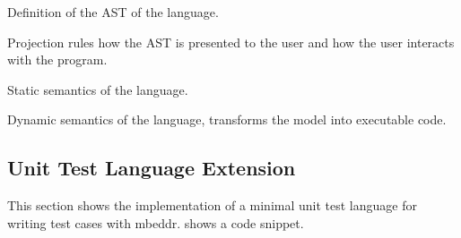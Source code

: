 Definition of the \ac{AST} of the language.

 Projection rules how the \ac{AST} is presented to the user and how the user interacts with the program.

 Static semantics of the language.
 
 Dynamic semantics of the language, transforms the model into executable code.

\subsection{Unit Test Language Extension}

This section shows the implementation of a minimal unit test language for
writing test cases with mbeddr.  shows a code
snippet.

